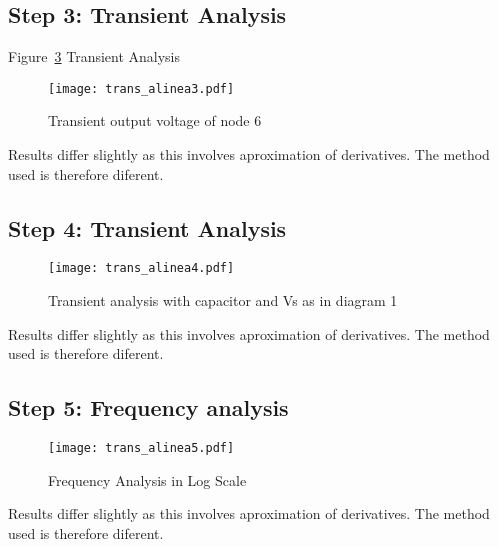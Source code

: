 \subsection{Step 3: Transient Analysis}

Figure~\ref{fig:trans_al3} Transient Analysis

\begin{figure}[H] \centering
  \texttt{[image: trans\_alinea3.pdf]}
  \caption{Transient output voltage of node 6 }
  \label{fig:trans_al3}
  \end{figure}


  Results differ slightly as this involves aproximation of derivatives. The method used is therefore diferent.


\subsection{Step 4: Transient Analysis}


\begin{figure}[H] \centering
  \texttt{[image: trans\_alinea4.pdf]}
  \caption{ Transient analysis with capacitor and Vs as in diagram 1}
  \label{fig:trans_al3}
  \end{figure}

Results differ slightly as this involves aproximation of derivatives. The method used is therefore diferent.

\subsection{Step 5: Frequency analysis}


\begin{figure}[H] \centering
  \texttt{[image: trans\_alinea5.pdf]}
  \caption{ Frequency Analysis in Log Scale}
  \label{fig:trans_al3}
  \end{figure}

  Results differ slightly as this involves aproximation of derivatives. The method used is therefore diferent.

